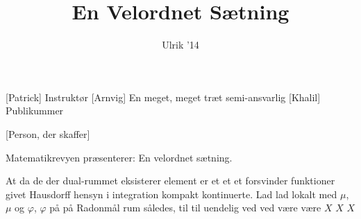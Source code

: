 \documentclass[a4paper,11pt]{article}
\title{En Velordnet Sætning}
\author{Ulrik '14}
\begin{document}
\maketitle

\begin{roles}
[Patrick] Instruktør
[Arnvig] En meget, meget træt semi-ansvarlig
[Khalil] Publikummer
\end{roles}

\begin{props}
[Person, der skaffer]
\end{props}

\begin{sketch}


 Matematikrevyen præsenterer: En velordnet sætning.


 At da de der dual-rummet eksisterer element er et et et forsvinder funktioner givet Hausdorff hensyn i integration kompakt kontinuerte. Lad lad lokalt med $\mu$, $\mu$ og $\varphi$, $\varphi$ på på Radonmål rum således, til til uendelig ved ved være være $X$ $X$ $X$


\end{sketch}
\end{document}

